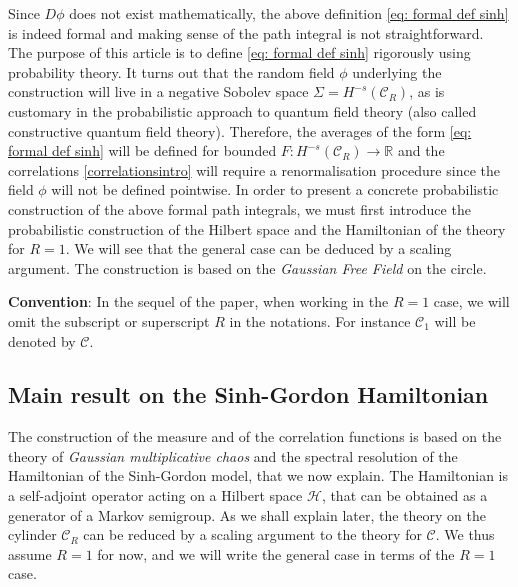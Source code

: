 \documentclass[11pt]{amsart}
\numberwithin{equation}{section}
\theoremstyle{definition}
\newcommand{\R}{\mathbb{R}}
\newcommand{\mc}{\mathcal}
\begin{document}
Since $D\phi$ does not exist mathematically, the above definition \eqref{eq: formal def sinh} is indeed formal and making sense of the path integral is not straightforward. The purpose of this article is to define \eqref{eq: formal def sinh} rigorously using probability theory. It turns out that the random field $\phi$ underlying the construction will live in a negative Sobolev space $\Sigma =H^{-s}(\mc{C}_R)$,  as is customary in the probabilistic approach to quantum field theory (also called constructive quantum field theory). Therefore, the averages of the form \eqref{eq: formal def sinh} will be defined for bounded $F: H^{-s}(\mc{C}_R) \rightarrow \R$ and the correlations \eqref{correlationsintro} will require a renormalisation procedure since the field $\phi$ will not be defined pointwise. In order to present a concrete probabilistic construction of the above formal path integrals, we must first introduce the probabilistic construction of the Hilbert space and the Hamiltonian of the theory for $R=1$. We will see that the general case can be deduced by a scaling argument. The construction is based on the \emph{Gaussian Free Field} on the circle. 

\vspace{0.1 cm}

\noindent
{\bf Convention}: In the sequel of the paper, when working in the $R=1$ case, we will omit the subscript or superscript $R$ in the notations. For instance $\mc{C}_1$ will be denoted by $\mc{C}$.



\subsection{Main result on the Sinh-Gordon Hamiltonian}

The construction of the measure and of the correlation functions is based on the theory of \emph{Gaussian multiplicative chaos} and the  spectral resolution of the Hamiltonian of the Sinh-Gordon model, that we now explain. 
The Hamiltonian is a self-adjoint operator acting on a Hilbert space $\mc{H}$, that can be obtained as a generator of a Markov semigroup. As we shall explain later, the theory on the cylinder $\mc{C}_R$ can be reduced by a scaling argument to the theory for $\mc{C}$. We thus assume $R=1$ for now, and we will write the general case in terms of the $R=1$ case.
\end{document}

